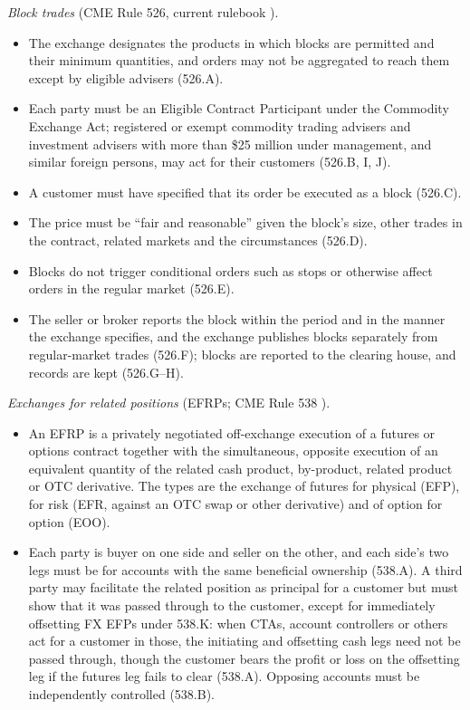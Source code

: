 \begin{qfconvention}\label{conv:futures-block-efrp}
 \emph{Block trades} (CME Rule 526, current rulebook \citep[Rule~526]{cme-rulebook-ch5}).
\begin{itemize}
\item The exchange designates the products in which blocks are permitted and their minimum quantities, and orders may not be aggregated to reach them except by eligible advisers (526.A).
\item Each party must be an Eligible Contract Participant under the Commodity Exchange Act; registered or exempt commodity trading advisers and investment advisers with more than \$25 million under management, and similar foreign persons, may act for their customers (526.B, I, J).
\item A customer must have specified that its order be executed as a block (526.C).
\item The price must be ``fair and reasonable'' given the block's size, other trades in the contract, related markets and the circumstances (526.D).
\item Blocks do not trigger conditional orders such as stops or otherwise affect orders in the regular market (526.E).
\item The seller or broker reports the block within the period and in the manner the exchange specifies, and the exchange publishes blocks separately from regular-market trades (526.F); blocks are reported to the clearing house, and records are kept (526.G--H).
\end{itemize}
\emph{Exchanges for related positions} (EFRPs; CME Rule 538 \citep[Rule~538]{cme-rulebook-ch5}).
\begin{itemize}
\item An EFRP is a privately negotiated off-exchange execution of a futures or options contract together with the simultaneous, opposite execution of an equivalent quantity of the related cash product, by-product, related product or OTC derivative. The types are the exchange of futures for physical (EFP), for risk (EFR, against an OTC swap or other derivative) and of option for option (EOO).
\item Each party is buyer on one side and seller on the other, and each side's two legs must be for accounts with the same beneficial ownership (538.A). A third party may facilitate the related position as principal for a customer but must show that it was passed through to the customer, except for immediately offsetting FX EFPs under 538.K: when CTAs, account controllers or others act for a customer in those, the initiating and offsetting cash legs need not be passed through, though the customer bears the profit or loss on the offsetting leg if the futures leg fails to clear (538.A). Opposing accounts must be independently controlled (538.B).

\end{itemize}
\end{qfconvention}
